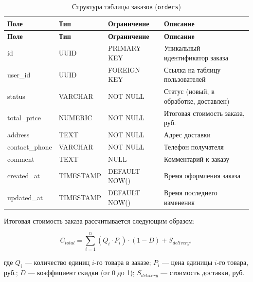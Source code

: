 \begin{longtable}{|l|l|p{3.5cm}|p{5.5cm}|}
    \caption{Структура таблицы заказов (\texttt{orders})} \label{tab:db_orders} \\

    \hline
    \textbf{Поле} & \textbf{Тип} & \textbf{Ограничение} & \textbf{Описание} \\ \hline
    \endfirsthead

    \tabcont{\ref{tab:db_orders}}
    \textbf{Поле} & \textbf{Тип} & \textbf{Ограничение} & \textbf{Описание} \\ \hline
    \endhead

    \hline
    \endfoot

    \hline
    \endlastfoot

    id             & UUID      & PRIMARY KEY   & Уникальный идентификатор заказа        \\ \hline
    user\_id       & UUID      & FOREIGN KEY   & Ссылка на таблицу пользователей        \\ \hline
    status         & VARCHAR   & NOT NULL      & Статус (новый, в обработке, доставлен) \\ \hline
    total\_price   & NUMERIC   & NOT NULL      & Итоговая стоимость заказа, руб.        \\ \hline
    address        & TEXT      & NOT NULL      & Адрес доставки                         \\ \hline
    contact\_phone & VARCHAR   & NOT NULL      & Телефон получателя                     \\ \hline
    comment        & TEXT      & NULL          & Комментарий к заказу                   \\ \hline
    created\_at    & TIMESTAMP & DEFAULT NOW() & Время оформления заказа                \\ \hline
    updated\_at    & TIMESTAMP & DEFAULT NOW() & Время последнего изменения             \\ \hline
\end{longtable}

Итоговая стоимость заказа рассчитывается следующим образом:

\begin{equation}
    C_{total} = \sum_{i=1}^{n} (Q_i \cdot P_i) \cdot (1 - D) + S_{delivery},
    \label{eq:total_cost}
\end{equation}

\noindent где $Q_i$ --- количество единиц $i$-го товара в заказе;
$P_i$ --- цена единицы $i$-го товара, руб.;
$D$ --- коэффициент скидки (от 0 до 1);
$S_{delivery}$ --- стоимость доставки, руб.

